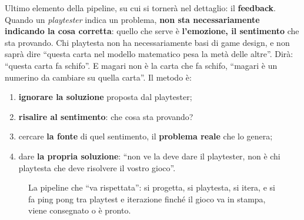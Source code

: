 Ultimo elemento della pipeline, su cui si tornerà nel dettaglio: il
\textbf{feedback}. Quando un \emph{playtester} indica un problema, \textbf{non sta
necessariamente indicando la cosa corretta}: quello che serve è
\textbf{l'emozione, il sentimento} che sta provando. Chi playtesta non ha
necessariamente basi di game design, e non saprà dire ``questa carta nel modello
matematico pesa la metà delle altre''. Dirà: ``questa carta fa schifo''. E magari
non è la carta che fa schifo, ``magari è un numerino da cambiare su quella
carta''. Il metodo è:
\begin{enumerate}
  \item \textbf{ignorare la soluzione} proposta dal playtester;
  \item \textbf{risalire al sentimento}: che cosa sta provando?
  \item cercare \textbf{la fonte} di quel sentimento, il \textbf{problema reale}
        che lo genera;
  \item dare \textbf{la propria soluzione}: ``non ve la deve dare il playtester,
        non è chi playtesta che deve risolvere il vostro gioco''.
\end{enumerate}

\begin{figure}[htbp]
\centering
{}
\caption{La pipeline che ``va rispettata'': si progetta, si playtesta, si itera,
e si fa ping pong tra playtest e iterazione finché il gioco va in stampa, viene
consegnato o è pronto.}
\label{a3:fig:pipeline}
\end{figure}

